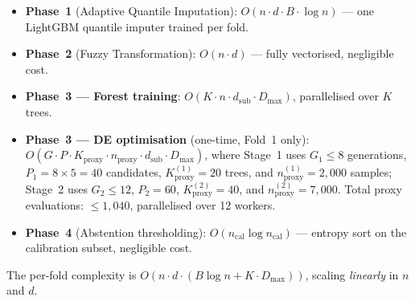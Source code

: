 \documentclass[a4paper,fleqn,longmktitle]{cas-sc}
\begin{document}
	\begin{itemize}[nosep, leftmargin=*]
		\item \textbf{Phase~1} (Adaptive Quantile Imputation):
		      $O(n \cdot d \cdot B \cdot \log n)$ — one LightGBM
		      quantile imputer trained per fold.

		\item \textbf{Phase~2} (Fuzzy Transformation):
		      $O(n \cdot d)$ — fully vectorised, negligible cost.

		\item \textbf{Phase~3 — Forest training}:
		      $O\!\left(K \cdot n \cdot d_{\text{sub}} \cdot
		      D_{\max}\right)$, parallelised over $K$ trees.

		\item \textbf{Phase~3 — DE optimisation} (one-time, Fold~1 only):
		      $O\!\left(G \cdot P \cdot
		      K_{\text{proxy}} \cdot n_{\text{proxy}} \cdot
		      d_{\text{sub}} \cdot D_{\max}\right)$,
		      where Stage~1 uses $G_1 \le 8$ generations,
		      $P_1 = 8 \times 5 = 40$ candidates,
		      $K_{\text{proxy}}^{(1)} = 20$ trees, and
		      $n_{\text{proxy}}^{(1)} = 2{,}000$ samples;
		      Stage~2 uses $G_2 \le 12$, $P_2 = 60$,
		      $K_{\text{proxy}}^{(2)} = 40$, and
		      $n_{\text{proxy}}^{(2)} = 7{,}000$.
		      Total proxy evaluations: ${\le}1{,}040$, parallelised over 12 workers.

		\item \textbf{Phase~4} (Abstention thresholding):
		      $O(n_{\text{cal}} \log n_{\text{cal}})$ — entropy sort
		      on the calibration subset, negligible cost.
	\end{itemize}

	The per-fold complexity is
	$O\!\left(n \cdot d \cdot (B \log n + K \cdot D_{\max})\right)$,
	scaling \emph{linearly} in $n$ and $d$.
\end{document}
